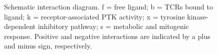  \begin{figure}[thpb]
      \centering
      
      \caption{Schematic interaction diagram. f = free ligand; b = TCRs
bound to ligand; k = receptor-associated PTK activity; x = tyrosine
kinase-dependent inhibitory pathway; s = metabolic and mitogenic
response. Positive and negative interactions are indicated by a plus and
minus sign, respectively.}
      \label{fig:6}
  \end{figure}

